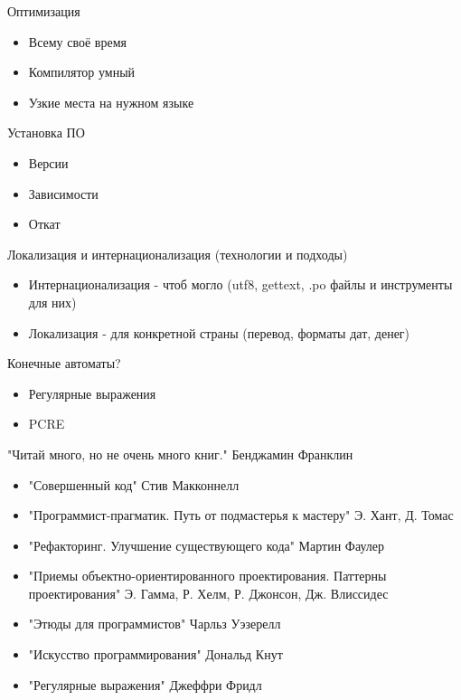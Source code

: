 \documentclass[aspectratio=169]{beamer}
\begin{document}
\begin{frame}{Оптимизация}
\begin{itemize}
\item Всему своё время
\pause
\item Компилятор умный
\pause
\item Узкие места на нужном языке
\end{itemize}
\end{frame}

\begin{frame}{Установка ПО}
\begin{itemize}
\item Версии
\pause
\item Зависимости
\pause
\item Откат
\end{itemize}
\end{frame}

\begin{frame}{Локализация и интернационализация (технологии и подходы)}
\begin{itemize}
\item Интернационализация - чтоб могло (utf8, gettext, .po файлы и инструменты для них)
\pause
\item Локализация - для конкретной страны (перевод, форматы дат, денег)
\end{itemize}
\end{frame}

\begin{frame}{Конечные автоматы?}
\begin{itemize}
\item Регулярные выражения
\pause
\item PCRE
\end{itemize}
\end{frame}

\begin{frame}{"Читай много, но не очень много книг." Бенджамин Франклин}
\begin{itemize}
\item "Совершенный код" Стив Макконнелл
\pause
\item "Программист-прагматик. Путь от подмастерья к мастеру" Э. Хант, Д. Томас
\pause
\item "Рефакторинг. Улучшение существующего кода" Мартин Фаулер
\pause
\item "Приемы объектно-ориентированного проектирования. Паттерны проектирования" Э. Гамма, Р. Хелм, Р. Джонсон, Дж. Влиссидес
\pause
\item "Этюды для программистов" Чарльз Уэзерелл
\pause
\item "Искусство программирования" Дональд Кнут
\pause
\item "Регулярные выражения" Джеффри Фридл
\end{itemize}
\end{frame}
\end{document}
